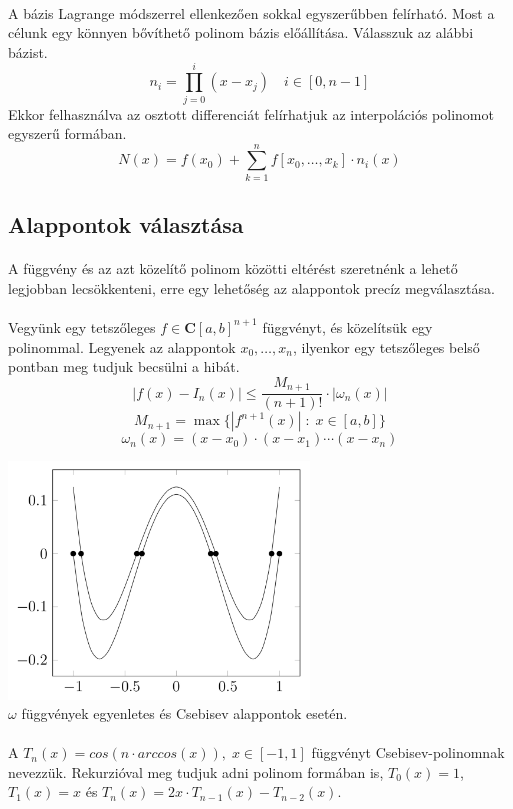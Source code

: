 \documentclass[12pt]{report}
\begin{document}
\paragraph{}
A bázis Lagrange módszerrel ellenkezően sokkal egyszerűbben felírható. Most a célunk egy könnyen bővíthető polinom bázis előállítása. Válasszuk az alábbi bázist.
$$
n_i = \prod_{j = 0}^{i}(x-x_j) \quad i \in [0, n - 1]
$$
Ekkor felhasználva az osztott differenciát felírhatjuk az interpolációs polinomot egyszerű formában.
$$
N(x) = f(x_0) + \sum_{k=1}^{n} f[x_0, \dots, x_k] \cdot n_i(x)
$$
\newpage
\subsection{Alappontok választása}
\paragraph{}
A függvény és az azt közelítő polinom közötti eltérést szeretnénk a lehető legjobban lecsökkenteni, erre egy lehetőség az alappontok precíz megválasztása.
\paragraph{}
Vegyünk egy tetszőleges $f \in \mathbf{C}[a,b]^{n+1}$ függvényt, és közelítsük egy polinommal. Legyenek az alappontok $x_0, \dots, x_n$, ilyenkor egy tetszőleges belső pontban meg tudjuk becsülni a hibát.
$$
|f(x) - I_n(x)| \leq \frac{M_{n+1}}{(n+1)!} \cdot |\omega_n(x)|
$$
$$
M_{n+1} = \max\{|f^{n+1}(x)| \; : \; x \in [a,b]\} 
$$
$$
\omega_n(x) = (x-x_0)\cdot(x-x_1)\cdots(x-x_n)
$$
\begin{center}
\includegraphics[width=8cm]{pics/chebyshev_and_even}\\
{\footnotesize $\omega$ függvények egyenletes és Csebisev alappontok esetén.}
\end{center}
\paragraph{}
A $T_n(x) = cos(n \cdot arccos(x)), \; x \in [-1, 1]$ függvényt Csebisev-polinomnak nevezzük. Rekurzióval meg tudjuk adni polinom formában is, $T_0(x)=1$, $T_1(x) = x$ és $T_n(x) = 2x \cdot T_{n-1}(x)-T_{n-2}(x)$.
\end{document}
